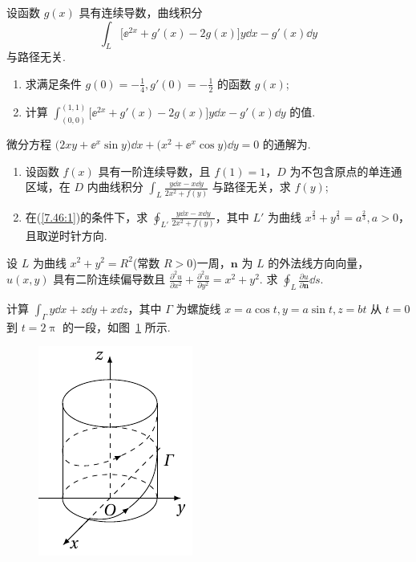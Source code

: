 	\begin{ti}
		设函数 $g(x)$ 具有连续导数，曲线积分
		\[
			\int_{L} \bigl[ \ee^{2x} + g'(x) - 2g(x) \bigr]y \dd{x} - g'(x) \dd{y}
		\]
		与路径无关.
		\begin{enumerate}
			\item 求满足条件 $g(0) = -\frac{1}{4}, g'(0) = -\frac{1}{2}$ 的函数 $g(x)$;
			\item 计算 $\int_{(0,0)}^{(1,1)} \bigl[ \ee^{2x} + g'(x) - 2g(x) \bigr]y \dd{x} - g'(x) \dd{y}$ 的值.
		\end{enumerate}
	\end{ti}

	\begin{ti}
		微分方程 $\bigl( 2xy + \ee^{x}\sin y \bigr) \dd{x} + \bigl( x^{2} + \ee^{x} \cos y \bigr) \dd{y} = 0$ 的通解为\htwo.
	\end{ti}

	\begin{ti}
		\begin{enumerate}
			\item 设函数 $f(x)$ 具有一阶连续导数，且 $f(1) = 1$，$D$ 为不包含原点的单连通区域，在 $D$ 内曲线积分 $\int_{L} \frac{y\dd{x} - x\dd{y}}{2x^{2} + f(y)}$ 与路径无关，求 $f(y)$;\label{7.46:1}
			\item 在(\ref{7.46:1})的条件下，求 $\oint_{L'} \frac{y\dd{x} - x\dd{y}}{2x^{2} + f(y)}$，其中 $L'$ 为曲线 $x^{\frac{2}{3}} + y^{\frac{2}{3}} = a^{\frac{2}{3}}, a > 0$，且取逆时针方向.
		\end{enumerate}
	\end{ti}

	\begin{ti}
		设 $L$ 为曲线 $x^{2} + y^{2} = R^{2}$(常数 $R > 0$)一周，$\bm n$ 为 $L$ 的外法线方向向量，$u(x,y)$ 具有二阶连续偏导数且 $\frac{\partial^{2}u}{\partial x^{2}} + \frac{\partial^{2}u}{\partial y^{2}} = x^{2} + y^{2}$. 求 $\oint_{L} \frac{\partial u}{\partial \bm n} \dd{s}$.
	\end{ti}

	\begin{ti}
		计算 $\int_{\varGamma} y\dd{x} + z\dd{y} + x\dd{z}$，其中 $\varGamma$ 为螺旋线 $x = a \cos t, y = a \sin t, z = bt$ 从 $t = 0$ 到 $t = 2\uppi$ 的一段，如图~\ref{fig:1.7.3} 所示.
		\begin{figure}[htbp]
			\centering
			\includegraphics[scale=1]{figure/fig1-7-3.pdf}
			\caption{}\label{fig:1.7.3}
		\end{figure}
	\end{ti}